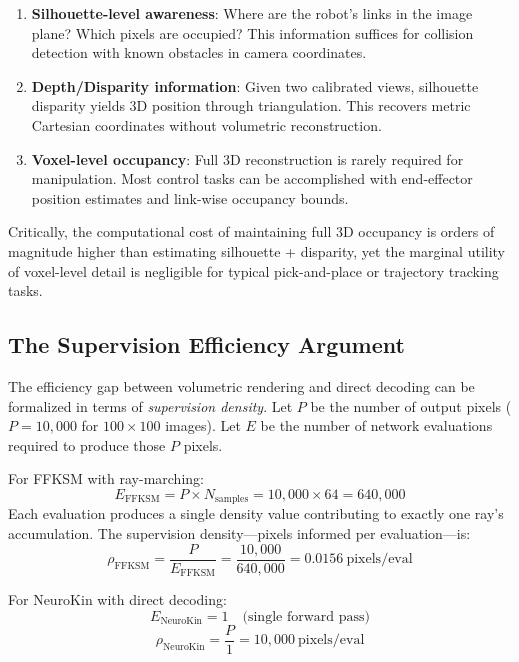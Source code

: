 \documentclass[12pt,a4paper,oneside]{report}
\begin{document}
\begin{enumerate}
    \item \textbf{Silhouette-level awareness}: Where are the robot's links in the image plane? Which pixels are occupied? This information suffices for collision detection with known obstacles in camera coordinates.
    \item \textbf{Depth/Disparity information}: Given two calibrated views, silhouette disparity yields 3D position through triangulation. This recovers metric Cartesian coordinates without volumetric reconstruction.
    \item \textbf{Voxel-level occupancy}: Full 3D reconstruction is rarely required for manipulation. Most control tasks can be accomplished with end-effector position estimates and link-wise occupancy bounds.
\end{enumerate}

Critically, the computational cost of maintaining full 3D occupancy is orders of magnitude higher than estimating silhouette + disparity, yet the marginal utility of voxel-level detail is negligible for typical pick-and-place or trajectory tracking tasks.

\subsection{The Supervision Efficiency Argument}

The efficiency gap between volumetric rendering and direct decoding can be formalized in terms of \textit{supervision density}. Let $P$ be the number of output pixels ($P = 10,000$ for $100 \times 100$ images). Let $E$ be the number of network evaluations required to produce those $P$ pixels.

For FFKSM with ray-marching:
\begin{equation}
E_{\text{FFKSM}} = P \times N_{\text{samples}} = 10,000 \times 64 = 640,000
\end{equation}
Each evaluation produces a single density value contributing to exactly one ray's accumulation. The supervision density---pixels informed per evaluation---is:
\begin{equation}
\rho_{\text{FFKSM}} = \frac{P}{E_{\text{FFKSM}}} = \frac{10,000}{640,000} = 0.0156\ \text{pixels/eval}
\end{equation}

For NeuroKin with direct decoding:
\begin{equation}
E_{\text{NeuroKin}} = 1 \quad \text{(single forward pass)}
\end{equation}
\begin{equation}
\rho_{\text{NeuroKin}} = \frac{P}{1} = 10,000\ \text{pixels/eval}
\end{equation}
\end{document}
